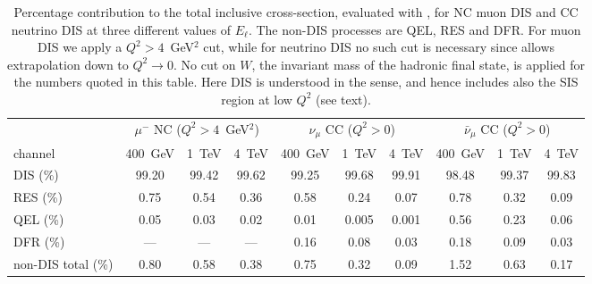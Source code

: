 \begin{table}[!tbp]
  \centering
    \renewcommand{\arraystretch}{1.60}
  \begin{tabularx}{\textwidth}{X | ccc | ccc | ccc}
    \toprule
    & \multicolumn{3}{c|}{$\mu^-$ NC ($Q^2 > 4$~GeV$^2$)} & \multicolumn{3}{c|}{$\nu_\mu$ CC ($Q^2 > 0$)}  & \multicolumn{3}{c}{$\bar\nu_\mu$ CC ($Q^2 > 0$)} \\
    channel & 400~GeV & 1~TeV & 4~TeV & 400~GeV & 1~TeV & 4~TeV & 400~GeV & 1~TeV & 4~TeV \\
    \midrule
    DIS  (\%)        & 99.20 & 99.42 & 99.62 & 99.25 & 99.68 & 99.91 & 98.48 & 99.37 & 99.83 \\
    \midrule
    RES   (\%)       &  0.75 &  0.54 &  0.36 &  0.58 &  0.24 &  0.07 &  0.78 &  0.32 &  0.09 \\
    QEL   (\%)       &  0.05 &  0.03 &  0.02 &  0.01 & 0.005 & 0.001 &  0.56 &  0.23 &  0.06 \\
    DFR   (\%)       & ---   & ---   & ---   &  0.16 &  0.08 &  0.03 &  0.18 &  0.09 &  0.03 \\
    \midrule
    non-DIS total (\%)    &  0.80 &  0.58 &  0.38 &  0.75 &  0.32 &  0.09 &  1.52 &  0.63 &  0.17 \\
    \bottomrule
  \end{tabularx}
  \vspace{0.3cm}
  \caption{Percentage contribution to the total inclusive cross-section, evaluated with \genie, for NC muon DIS and CC neutrino DIS at three different values of $E_\ell$.
  The non-DIS processes are QEL, RES and DFR.
%
For muon DIS we apply a $Q^2 > 4$~GeV$^2$ cut, while for neutrino DIS no such cut is necessary since \genie allows extrapolation down to $Q^2\to 0$. 
%
No cut on $W$, the invariant mass of the hadronic final state, is applied for the numbers quoted in this table.
%
Here DIS is understood in the \genie sense, and hence includes also the SIS region at low $Q^2$ (see text).
}
  \label{tab:nondis}
\end{table}

